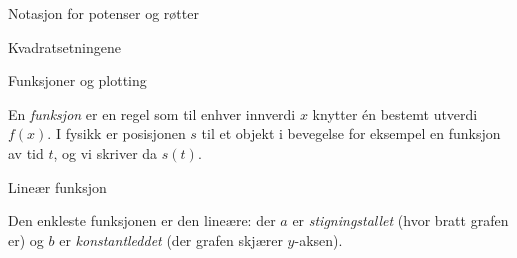 \documentclass[aspectratio=169, 12pt]{beamer}
\begin{document}
\begin{frame}{Notasjon for potenser og røtter}

  \pause

\end{frame}

\begin{frame}{Kvadratsetningene}


\end{frame}

\begin{frame}{Funksjoner og plotting}

  En \textit{funksjon} er en regel som til enhver innverdi $x$ knytter én bestemt utverdi $f(x)$. I fysikk er posisjonen $s$ til et objekt i bevegelse for eksempel en funksjon av tid $t$, og vi skriver da $s(t)$.

\end{frame}

\begin{frame}{Lineær funksjon}

  Den enkleste funksjonen er den lineære:
  der $a$ er \textit{stigningstallet} (hvor bratt grafen er) og $b$ er \textit{konstantleddet} (der grafen skjærer $y$-aksen).
  \pause

\end{frame}
\end{document}
